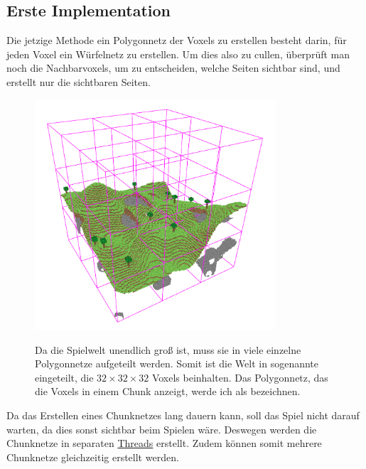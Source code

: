 \subsection{Erste Implementation}

Die jetzige Methode ein Polygonnetz der Voxels
zu erstellen besteht darin, für jeden Voxel
ein Würfelnetz zu erstellen.
Um dies also zu cullen, überprüft man
noch die Nachbarvoxels, um zu entscheiden,
welche Seiten sichtbar sind, und erstellt nur
die sichtbaren Seiten.


\begin{figure}[ht]
	\begin{minipage}[c]{0.49\textwidth}
		\begin{center}
\includegraphics[width=0.8\textwidth]{../assets/culling/chunk_borders.png}
		\end{center}
	\end{minipage}
	\begin{minipage}[c]{0.49\textwidth}
Da die Spielwelt unendlich groß ist, muss sie
in viele einzelne Polygonnetze aufgeteilt werden.
Somit ist die Welt in sogenannte 
eingeteilt, die $32 \times 32 \times 32$ Voxels
beinhalten. Das Polygonnetz, das die Voxels in einem
Chunk anzeigt, werde ich als
 bezeichnen.
	\end{minipage}\hfill
\end{figure}

Da das Erstellen eines Chunknetzes lang dauern kann,
soll das Spiel nicht darauf warten,
da dies sonst sichtbar beim Spielen wäre.
Deswegen werden die Chunknetze in separaten
\href{https://de.wikipedia.org/wiki/Thread_(Informatik)}{Threads}
\cite{wiki_thread} erstellt.
Zudem können somit mehrere Chunknetze gleichzeitig
erstellt werden.

